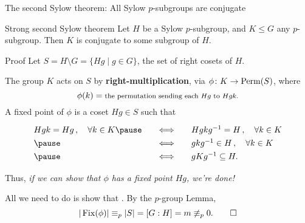 \documentclass[8pt, handout]{beamer}
\newcommand{\Pause}{\pause}      %
\begin{document}

\begin{frame}{The second Sylow theorem: All Sylow $p$-subgroups are 
    conjugate} 

  \begin{block}{Strong second Sylow theorem}
    Let $H$ be a Sylow $p$-subgroup, and $K\leq G$ any
    $p$-subgroup. Then $K$ is conjugate to some subgroup of $H$.
  \end{block}  
  
  \begin{exampleblock}{Proof} %
    Let $S=H\!\setminus\!G=\{Hg\mid g\in G\}$, the set of right cosets of $H$.
    
    \Pause\medskip
    
    The group $K$ acts on $S$ by \textbf{right-multiplication}, via $\phi\colon
    K\to\operatorname{Perm}(S)$, where \vspace{-1mm}
    \[
    \phi(k)=\mbox{\footnotesize the permutation sending each $Hg$ to
      $Hgk$.}
    \]   
    \pause A {\color{xGreen}fixed point} of $\phi$ is a coset $Hg\in S$ such
    that \vspace{-1mm}
    \[
    \renewcommand{\arraystretch}{1.3}
    \begin{array}{lll}
      Hgk=Hg\,,\quad\forall k\in K\Pause\quad & \Longleftrightarrow\quad &
      Hgkg^{-1}=H\,,\quad\forall k\in K
      \\ \Pause \quad &\Longleftrightarrow\quad &
      gkg^{-1}\in H\,,\quad\forall k\in K
      \\ \Pause \quad &\Longleftrightarrow\quad &
      gKg^{-1}\subseteq H.
    \end{array}
    \]

  \Pause

  Thus, \emph{if we can show that $\phi$ has a fixed point $Hg$, we're done!}

  \pause\medskip

  All we need to do is show that
  . \Pause By the $p$-group Lemma,
  \[
  |\operatorname{Fix}(\phi)|\equiv_p|S|=[G:H]=m\not\equiv_p 0. \tag*{$\hfill\Box$}
  \]
  \end{exampleblock}
  
\end{frame}

\end{document}
